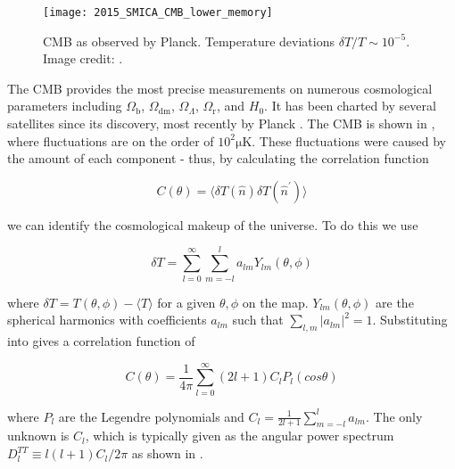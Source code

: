 \begin{figure}
\centering
\texttt{[image: 2015\_SMICA\_CMB\_lower\_memory]}
\caption{CMB as observed by Planck.  Temperature deviations $\delta T/T \sim 10^{-5}$.  Image credit: .}
\label{fig:planck_map}
\end{figure}


The CMB provides the most precise measurements on numerous cosmological parameters including $\Omega_{\mathrm{b}}$,
$\Omega_{\mathrm{dm}}$, $\Omega_{\Lambda}$, $\Omega_{\mathrm{r}}$, and $H_{0}$.  It has been charted by several satellites since
its
discovery, most recently by Planck .  The CMB is shown in ,
where fluctuations are on the order of $10^{2} \mathrm{\mu K}$.  These fluctuations were caused by the
amount of each component - thus, by calculating the correlation function

\begin{equation}
C(\theta) = \Big \langle \delta T( \hat{n}) \delta T(\hat{n}^\prime) \Big \rangle
\label{eq:cmb_corr_func}
\end{equation}

\noindent we can identify the cosmological makeup of the universe.  To do this we use

\begin{equation}
\delta T = \sum\limits_{l=0}^{\infty} \sum\limits_{m=-l}^{l} a_{lm}Y_{lm}(\theta, \phi)
\label{eq:cmb_delta_t}
\end{equation}

\noindent where $\delta T = T(\theta, \phi) - \langle T \rangle$ for a given $\theta , \phi$
on the map.  $Y_{lm}(\theta, \phi)$ are the spherical harmonics with coefficients $a_{lm}$
such that $\sum\limits_{l,m} |a_{lm}|^{2} = 1$.  Substituting  into  gives a correlation
function of

\begin{equation}
C(\theta) = \frac{1}{4 \pi} \sum\limits_{l=0}^{\infty} (2l + 1) C_{l} P_{l}(cos \theta)
\end{equation}

\noindent where $P_{l}$ are the Legendre polynomials and $C_{l} = \frac{1}{2l + 1} \sum\limits_{m=-l}^{l} a_{lm}$.  The
only unknown is $C_{l}$, which is typically given as the angular power spectrum
$D_{l}^{TT} \equiv l(l+1)C_{l}/2\pi$ as shown in .


